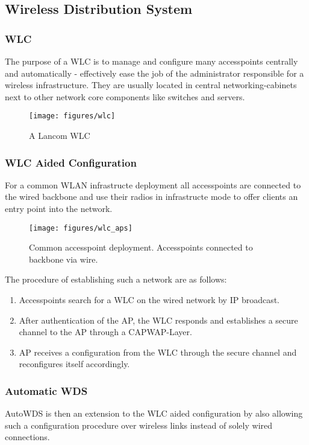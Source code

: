     \subsection{Wireless Distribution System}
      \subsubsection{\ac{WLC}}
	The purpose of a \ac{WLC} is to manage and configure many accesspoints centrally and automatically - effectively ease the job of the administrator responsible for a 
	wireless infrastructure. They are usually located in central networking-cabinets next to other network core components like switches and servers.
	\begin{figure}[h!]
	  \centering
	  \texttt{[image: figures/wlc]}
	  \caption{A Lancom \ac{WLC}}
	  \label{fig:wlc}
	\end{figure}
      
      \subsubsection{WLC Aided Configuration}
	For a common WLAN infrastructe deployment all accesspoints are connected to the wired backbone and use their radios in infrastructe mode to 
	offer clients an entry point into the network.
	\begin{figure}[h!]
	  \centering
	  \texttt{[image: figures/wlc\_aps]}
	  \caption{Common accesspoint deployment. Accesspoints connected to backbone via wire.}
	  \label{fig:wlc_aps}
	\end{figure}
	The procedure of establishing such a network are as follows:
	\begin{enumerate}
	 \item Accesspoints search for a \ac{WLC} on the wired network by IP broadcast.
	 \item After authentication of the \ac{AP}, the \ac{WLC} responds and establishes a secure channel to the \ac{AP} through a \ac{CAPWAP}-Layer.
	 \item \ac{AP} receives a configuration from the \ac{WLC} through the secure channel and reconfigures itself accordingly.
	\end{enumerate}
	
      \subsubsection{Automatic \ac{WDS}}
      AutoWDS is then an extension to the WLC aided configuration by also allowing such a configuration procedure over wireless links instead of solely wired connections.
            
